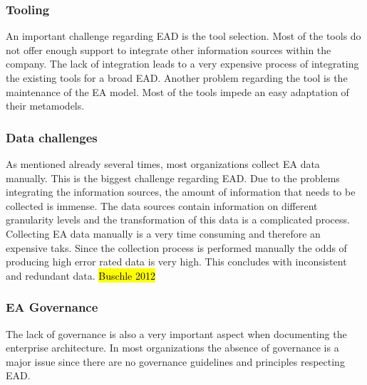 \subsubsection{Tooling}
An important challenge regarding EAD is the tool selection. Most of the tools do not offer enough support to integrate other information sources within the company. The lack of integration leads to a very expensive process of integrating the existing tools for a broad EAD.
Another problem regarding the tool is the maintenance of the EA model. Most of the tools impede an easy adaptation of their metamodels.

\subsubsection{Data challenges}
As mentioned already several times, most organizations collect EA data manually. This is the biggest challenge regarding EAD. Due to the problems integrating the information sources, the amount of information that needs to be collected is immense. The data sources contain information on different granularity levels and the transformation of this data is a complicated process.
Collecting EA data manually is a very time consuming and therefore an expensive taks. Since the collection process is performed manually the odds of producing high error rated data is very high. This concludes with inconsistent and redundant data. \hl{Buschle 2012}

\subsubsection{EA Governance}
The lack of governance is also a very important aspect when documenting the enterprise architecture. In most organizations the absence of governance is a major issue since there are no governance guidelines and principles respecting EAD.




